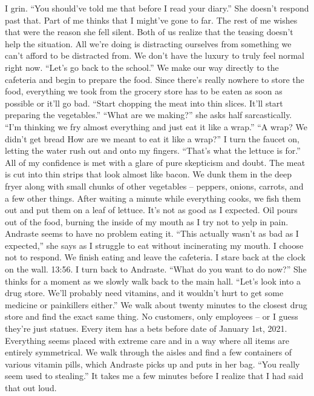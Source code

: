 \documentclass[a4paper, 12pt]{book}
\newcommand\tab[1][1cm]{\hspace*{#1}}
\begin{document}
\newline
\tab
I grin. ``You should’ve told me that before I read your diary.'' 
\newline
\tab
She doesn’t respond past that. Part of me thinks that I might’ve gone to far. The rest of me wishes that were the reason she fell silent. Both of us realize that the teasing doesn’t help the situation. All we’re doing is distracting ourselves from something we can’t afford to be distracted from. We don’t have the luxury to truly feel normal right now. ``Let’s go back to the school.''
\newline
\tab
We make our way directly to the cafeteria and begin to prepare the food. Since there’s really nowhere to store the food, everything we took from the grocery store has to be eaten as soon as possible or it’ll go bad. ``Start chopping the meat into thin slices. It’ll start preparing the vegetables.''
\newline
\tab
``What are we making?'' she asks half sarcastically.
\newline
\tab
``I’m thinking we fry almost everything and just eat it like a wrap.''
\newline
\tab
``A wrap? We didn’t get bread How are we meant to eat it like a wrap?''
\newline
\tab
I turn the faucet on, letting the water rush out and onto my fingers. ``That’s what the lettuce is for.'' All of my confidence is met with a glare of pure skepticism and doubt.
\newline
\tab
The meat is cut into thin strips that look almost like bacon. We dunk them in the deep fryer along with small chunks of other vegetables -- peppers, onions, carrots, and a few other things. After waiting a minute while everything cooks, we fish them out and put them on a leaf of lettuce. It’s not as good as I expected. Oil pours out of the food, burning the inside of my mouth as I try not to yelp in pain. Andraste seems to have no problem eating it. ``This actually wasn’t as bad as I expected,'' she says as I struggle to eat without incinerating my mouth. I choose not to respond.
\newline
\tab
We finish eating and leave the cafeteria. I stare back at the clock on the wall. 13:56. I turn back to Andraste. ``What do you want to do now?''
\newline
\tab
She thinks for a moment as we slowly walk back to the main hall. ``Let’s look into a drug store. We’ll probably need vitamins, and it wouldn’t hurt to get some medicine or painkillers either.'' We walk about twenty minutes to the closest drug store and find the exact same thing. No customers, only employees -- or I guess they’re just statues. Every item has a bets before date of January 1st, 2021. Everything seems placed with extreme care and in a way where all items are entirely symmetrical. We walk through the aisles and find a few containers of various vitamin pills, which Andraste picks up and puts in her bag. ``You really seem used to stealing.'' It takes me a few minutes before I realize that I had said that out loud.
\end{document}
